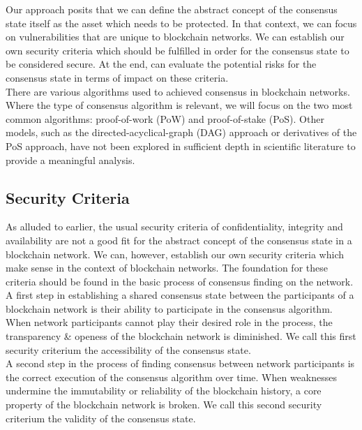 \documentclass[12pt,a4paper]{article}
\begin{document}
Our approach posits that we can define the abstract concept of the consensus state itself as the asset which needs to be protected. In that context, we can focus on vulnerabilities that are unique to blockchain networks. We can establish our own security criteria which should be fulfilled in order for the consensus state to be considered secure. At the end, can evaluate the potential risks for the consensus state in terms of impact on these criteria.\\

There are various algorithms used to achieved consensus in blockchain networks. Where the type of consensus algorithm is relevant, we will focus on the two most common algorithms: proof-of-work (PoW) and proof-of-stake (PoS). Other models, such as the directed-acyclical-graph (DAG) approach or derivatives of the PoS approach, have not been explored in sufficient depth in scientific literature to provide a meaningful analysis.\\

\subsection{Security Criteria}

As alluded to earlier, the usual security criteria of confidentiality, integrity and availability are not a good fit for the abstract concept of the consensus state in a blockchain network. We can, however, establish our own security criteria which make sense in the context of blockchain networks. The foundation for these criteria should be found in the basic process of consensus finding on the network.\\

A first step in establishing a shared consensus state between the participants of a blockchain network is their ability to participate in the consensus algorithm. When network participants cannot play their desired role in the process, the transparency \& openess of the blockchain network is diminished. We call this first security criterium the accessibility of the consensus state.\\

A second step in the process of finding consensus between network participants is the correct execution of the consensus algorithm over time. When weaknesses undermine the immutability or reliability of the blockchain history, a core property of the blockchain network is broken. We call this second security criterium the validity of the consensus state.\\
\end{document}
